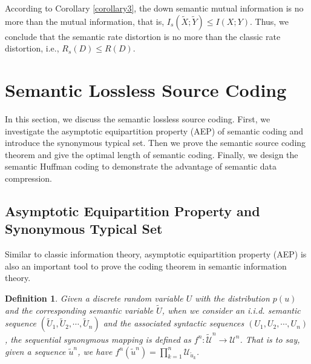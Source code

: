 \documentclass[12pt, draftclsnofoot,onecolumn]{IEEEtran}
\newtheorem{definition}{\bf{Definition}}
\begin{document}
According to Corollary \ref{corollary3}, the down semantic mutual information is no more than the mutual information, that is, $I_s(\tilde{X};\tilde{Y})\leq I(X;Y) $. Thus, we conclude that the semantic rate distortion is no more than the classic rate distortion, i.e., $R_s(D)\leq R(D)$.

\section{Semantic Lossless Source Coding}
\label{section_VI}
In this section, we discuss the semantic lossless source coding. First, we investigate the asymptotic equipartition property (AEP) of semantic coding and introduce the synonymous typical set. Then we prove the semantic source coding theorem and give the optimal length of semantic coding. Finally, we design the semantic Huffman coding to demonstrate the advantage of semantic data compression.

\subsection{Asymptotic Equipartition Property and Synonymous Typical Set}
Similar to classic information theory, asymptotic equipartition property (AEP) is also an important tool to prove the coding theorem in semantic information theory.

\begin{definition}
Given a discrete random variable $U$ with the distribution $p(u)$ and the corresponding semantic variable $\tilde {U}$, when we consider an i.i.d. semantic sequence $(\tilde {U}_1,\tilde {U}_2,\cdots,\tilde {U}_n)$ and the associated syntactic sequences $\left(U_1,U_2,\cdots,U_n\right)$, the sequential synonymous mapping is defined as $f^{n}: \tilde{\mathcal{U}}^{n}\to\mathcal{U}^{n}$. That is to say, given a sequence $\tilde {u}^n$, we have $f^n\left(\tilde {u}^n\right)=\prod_{k=1}^{n}\mathcal{U}_{\tilde{u}_{k}}$.
\end{definition}
\end{document}

